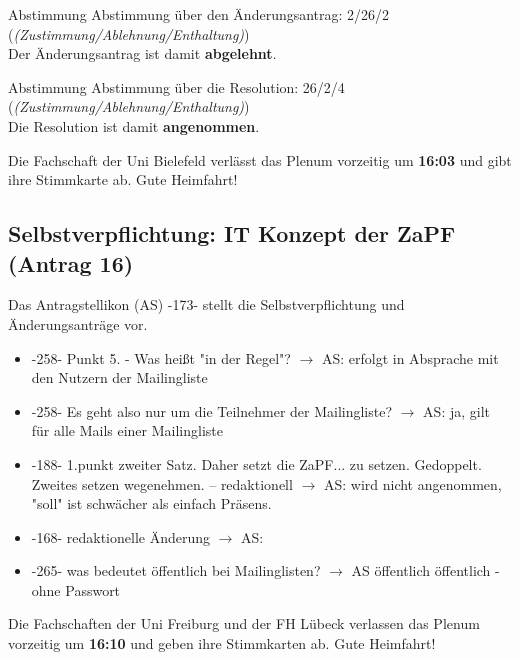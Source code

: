     \begin{danger}{Abstimmung}
      Abstimmung über den Änderungsantrag: 2/26/2 (\textit{(Zustimmung/Ablehnung/Enthaltung)}) \\
      Der Änderungsantrag ist damit \textbf{abgelehnt}.
    \end{danger}

    \begin{success}{Abstimmung}
      Abstimmung über die Resolution: 26/2/4 (\textit{(Zustimmung/Ablehnung/Enthaltung)}) \\
      Die Resolution ist damit \textbf{angenommen}.
    \end{success}

    \begin{info}{}
      Die Fachschaft der Uni Bielefeld verlässt das Plenum vorzeitig um \textbf{16:03} und gibt ihre Stimmkarte ab. Gute Heimfahrt!
    \end{info}

  \subsection{Selbstverpflichtung: IT Konzept der ZaPF (Antrag 16)}
    Das Antragstellikon (AS) -173- stellt die Selbstverpflichtung und Änderungsanträge vor.
    \begin{itemize}
      \item -258- Punkt 5. - Was heißt "in der Regel"?
        $\rightarrow$ AS: erfolgt in Absprache mit den Nutzern der Mailingliste
      \item -258- Es geht also nur um die Teilnehmer der Mailingliste?
        $\rightarrow$ AS: ja, gilt für alle Mails einer Mailingliste
      \item -188- 1.punkt zweiter Satz. Daher setzt die ZaPF... zu setzen. Gedoppelt. Zweites setzen  wegenehmen. -- redaktionell
        $\rightarrow$ AS: wird nicht angenommen, "soll" ist schwächer als einfach Präsens.
      \item -168- redaktionelle Änderung
        $\rightarrow$ AS:
      \item -265- was bedeutet öffentlich bei Mailinglisten?
        $\rightarrow$ AS öffentlich öffentlich - ohne Passwort
    \end{itemize}

    \begin{info}{}
      Die Fachschaften der Uni Freiburg und der FH Lübeck verlassen das Plenum vorzeitig um \textbf{16:10} und geben ihre Stimmkarten ab. Gute Heimfahrt!
    \end{info}

